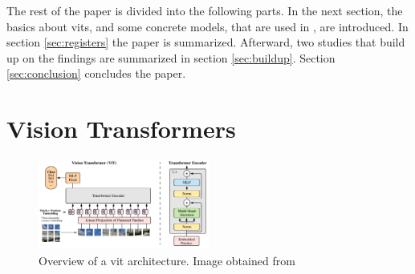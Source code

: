 \documentclass[conference]{IEEEtran}
\begin{document}
  The rest of the paper is divided into the following parts. In the next section, the basics about \acp{vit}, and some concrete models, that are used in \cite{registers}, are introduced. In section \ref{sec:registers} the paper \cite{registers} is summarized. Afterward, two studies that build up on the findings are summarized in section \ref{sec:buildup}. Section \ref{sec:conclusion} concludes the paper.

  \section{Vision Transformers}
  \label{sec:vits}

  \begin{figure}
    \centering
    \includegraphics[width=0.5\textwidth]{figures/vit-architecture.png}
    \caption{Overview of a \ac{vit} architecture. Image obtained from \cite{visiontransformers2021}}
    \label{fig:vit-architecture}
  \end{figure}
\end{document}
